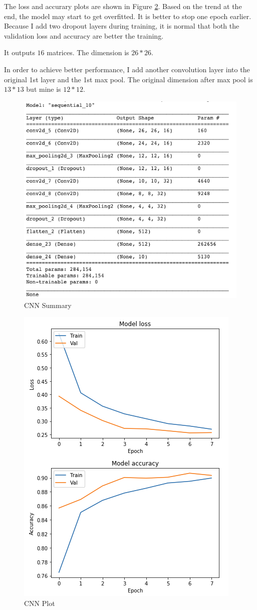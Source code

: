 \documentclass[11pt]{article}
\begin{document}
\begin{enumerate}
The loss and accurary plots are shown in Figure \ref{fig:cnn_plot}. Based on the trend at the end, the model may start to get overfitted. It is better to stop one epoch earlier. Because I add two dropout layers during training, it is normal that both the validation loss and accuracy are better the training.

It outputs $16$ matrices. The dimension is $26*26$.

In order to achieve better performance, I add another convolution layer into the original 1st layer and the 1st max pool. The original dimension after max pool is $13*13$ but mine is $12*12$.


\begin{figure}[!h]
  \centering
  \includegraphics[width=0.8\linewidth]{figures/cnn/summary.png}
  \caption{CNN Summary}
  \label{fig:cnn_summary}
\end{figure}

\begin{figure}[!h]
  \centering
  \includegraphics[width=0.4\linewidth]{figures/cnn/plot.png}
  \caption{CNN Plot}
  \label{fig:cnn_plot}
\end{figure}



\end{enumerate}
\end{document}
